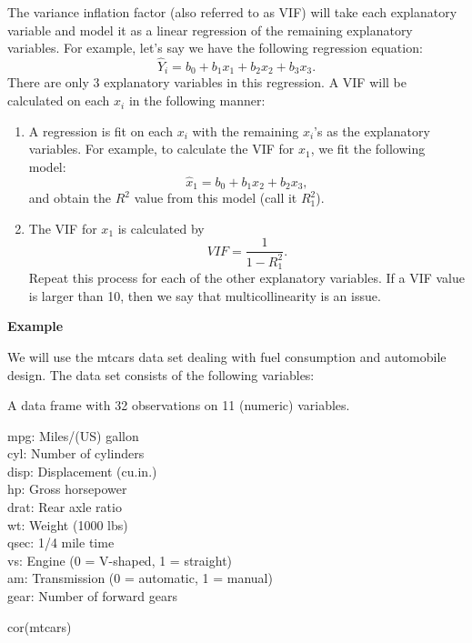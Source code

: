 \documentclass[
  letterpaper,
  DIV=11,
  numbers=noendperiod]{scrreprt}
\newenvironment{Shaded}{\begin{snugshade}}{\end{snugshade}}
\newcommand{\FunctionTok}[1]{\textcolor[rgb]{0.28,0.35,0.67}{#1}}
\newcommand{\NormalTok}[1]{\textcolor[rgb]{0.00,0.23,0.31}{#1}}
\providecommand{\tightlist}{%
  \setlength{\itemsep}{0pt}\setlength{\parskip}{0pt}}\usepackage{longtable,booktabs,array}
\begin{document}
The variance inflation factor (also referred to as VIF) will take each
explanatory variable and model it as a linear regression of the
remaining explanatory variables. For example, let's say we have the
following regression equation:\\
\[\widehat{Y}_{i}=b_{0} + b_{1}x_{1}+ b_{2}x_{2}+ b_{3}x_{3}.\] There
are only 3 explanatory variables in this regression. A VIF will be
calculated on each \(x_{i}\) in the following manner:

\begin{enumerate}
\def\labelenumi{\arabic{enumi}.}
\tightlist
\item
  A regression is fit on each \(x_{i}\) with the remaining \(x_{i}\)'s
  as the explanatory variables. For example, to calculate the VIF for
  \(x_{1}\), we fit the following model:\\
  \[\widehat{x}_{1}=b_{0} + b_{1}x_{2}+ b_{2}x_{3},\] and obtain the
  \(R^2\) value from this model (call it \(R_{1}^2\)).\\
\item
  The VIF for \(x_{1}\) is calculated by \[VIF=\frac{1}{1-R_{1}^2}.\]
  Repeat this process for each of the other explanatory variables. If a
  VIF value is larger than 10, then we say that multicollinearity is an
  issue.
\end{enumerate}

\textbf{Example}

We will use the mtcars data set dealing with fuel consumption and
automobile design. The data set consists of the following variables:

A data frame with 32 observations on 11 (numeric) variables.

mpg: Miles/(US) gallon\\
cyl: Number of cylinders\\
disp: Displacement (cu.in.)\\
hp: Gross horsepower\\
drat: Rear axle ratio\\
wt: Weight (1000 lbs)\\
qsec: 1/4 mile time\\
vs: Engine (0 = V-shaped, 1 = straight)\\
am: Transmission (0 = automatic, 1 = manual)\\
gear: Number of forward gears

\begin{Shaded}
\begin{Highlighting}[]
\FunctionTok{cor}\NormalTok{(mtcars)}
\end{Highlighting}
\end{Shaded}
\end{document}
